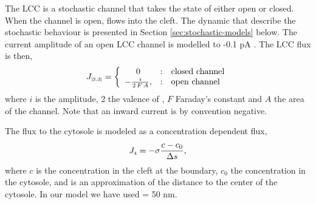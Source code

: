 The LCC is a stochastic channel that takes the state of either open or closed. When the channel is open, \Ca flows into the cleft. The dynamic that describe the stochastic behaviour is presented in Section \ref{sec:stochastic-models} below. The current amplitude of an open LCC channel is modelled to -0.1 pA \cite{GuiaSternEtAl2001}. The LCC flux is then,
\begin{equation}
\label{eq:constant-current-flux}
J_{\scriptscriptstyle[2,3]}= \left\{
  \begin{array}{c@{\quad:\quad}l}
    0& \text{closed channel}\\
    - \frac{i}{2\,F\,A},& \text{open channel}
  \end{array}
\right.
\end{equation}
\noindent where $i$ is the amplitude, 2 the valence of \Ca, $F$ Faraday's constant and $A$ the area of the channel. Note that an inward current is by convention negative.\par
The flux to the cytosole is modeled as a concentration dependent flux,
\begin{equation}
  \label{eq:conc-dependent-flux}
  J_{\scriptscriptstyle 4}= -\sigma\frac{c - c_0}{\Delta{}s},
\end{equation}
where $c$ is the concentration in the cleft at the boundary, $c_0$ the concentration in the cytosole, and \Ds is an approximation of the distance to the center of the cytosole. In our model we have used \Ds = 50 nm.\par


